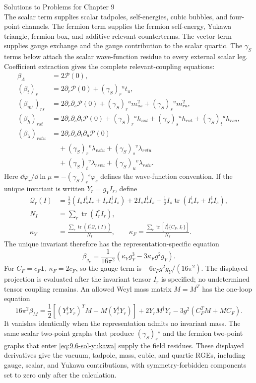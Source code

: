 \begin{bankssolutions}{Solutions to Problems for Chapter 9}
\[\]
The scalar term supplies scalar tadpoles, self-energies, cubic bubbles, and
four-point channels.  The fermion term supplies the fermion self-energy,
Yukawa triangle, fermion box, and additive relevant counterterms.  The vector
term supplies gauge exchange and the gauge contribution to the scalar
quartic.  The $\gamma_S$ terms below attach the scalar wave-function residue
to every external scalar leg.
Coefficient extraction gives the complete relevant-coupling equations:
\begin{align*}
 \beta_\Lambda&=2\mathcal P(0),\\
 (\beta_t)_r&=2\partial_r\mathcal P(0)+(\gamma_S)_r{}^u t_u,\\
 (\beta_{m^2})_{rs}&=2\partial_r\partial_s\mathcal P(0)
 +(\gamma_S)_r{}^u m^2_{us}+(\gamma_S)_s{}^u m^2_{ru},\\
 (\beta_h)_{rst}&=2\partial_r\partial_s\partial_t\mathcal P(0)
 +(\gamma_S)_r{}^u h_{ust}+(\gamma_S)_s{}^u h_{rut}
 +(\gamma_S)_t{}^u h_{rsu},\\
 (\beta_\lambda)_{rstu}&=2\partial_r\partial_s\partial_t\partial_u\mathcal P(0)\\
 &\quad +(\gamma_S)_r{}^v\lambda_{vstu}+(\gamma_S)_s{}^v\lambda_{rvtu}\\
 &\quad +(\gamma_S)_t{}^v\lambda_{rsvu}+(\gamma_S)_u{}^v\lambda_{rstv}.
\end{align*}
Here $\dd\varphi_r/\dd\ln\mu=-(\gamma_S)_r{}^s\varphi_s$ defines the
wave-function convention.  If the unique invariant is written
$Y_r=g_Y I_r$, define
\begin{align*}
 \mathcal Q_r(I)&=\frac12(I_sI_s^\dagger I_r+I_rI_s^\dagger I_s)
 +2I_sI_r^\dagger I_s
 +\frac12I_s\operatorname{tr}(I_s^\dagger I_r+I_r^\dagger I_s),\\
 N_I&=\sum_r\operatorname{tr}(I_r^\dagger I_r),\\
 \kappa_Y&=\frac{\sum_r\operatorname{tr}(I_r^\dagger\mathcal Q_r(I))}{N_I},
 \qquad
 \kappa_F=\frac{\sum_r\operatorname{tr}
 [I_r^\dagger\{C_F,I_r\}]}{N_I}.
\end{align*}
The unique invariant therefore has the representation-specific equation
\[
 \beta_{g_Y}=\frac{1}{16\pi^2}
 \left(\kappa_Yg_Y^3-3\kappa_Fg^2g_Y\right).
\]
For $C_F=c_F\mathbf1$, $\kappa_F=2c_F$, so the gauge term is
$-6c_Fg^2g_Y/(16\pi^2)$.  The displayed projection is evaluated after the
invariant tensor $I_r$ is specified; no undetermined tensor coupling remains.
An allowed Weyl mass matrix $M=M^T$ has the one-loop equation
\[
 16\pi^2\beta_M=\frac12\left[(Y_r^\dagger Y_r)^T M
 +M(Y_r^\dagger Y_r)\right]+2Y_rM^\dagger Y_r
 -3g^2\left(C_F^T M+MC_F\right).
\]
It vanishes identically when the representation admits no invariant mass.
The same scalar two-point graphs that produce
$(\gamma_S)_r{}^s$ and the fermion two-point graphs that enter
\eqref{eq:9.6-sol-yukawa} supply the field residues.  These displayed
derivatives give the vacuum, tadpole, mass, cubic, and quartic RGEs, including
gauge, scalar, and Yukawa contributions, with symmetry-forbidden components
set to zero only after the calculation.


\end{bankssolutions}
